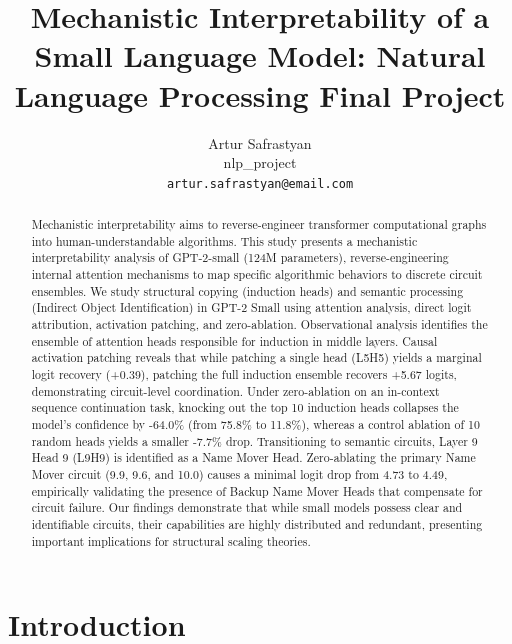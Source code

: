 \documentclass[11pt]{article}
\title{Mechanistic Interpretability of a Small Language Model: Natural Language Processing Final Project}
\author{Artur Safrastyan \\
  nlp\_project \\
  \texttt{artur.safrastyan@email.com}}
\begin{document}
\maketitle

\begin{abstract}
Mechanistic interpretability aims to reverse-engineer transformer computational graphs into human-understandable algorithms. This study presents a mechanistic interpretability analysis of GPT-2-small (124M parameters), reverse-engineering internal attention mechanisms to map specific algorithmic behaviors to discrete circuit ensembles. We study structural copying (induction heads) and semantic processing (Indirect Object Identification) in GPT-2 Small using attention analysis, direct logit attribution, activation patching, and zero-ablation. Observational analysis identifies the ensemble of attention heads responsible for induction in middle layers. Causal activation patching reveals that while patching a single head (L5H5) yields a marginal logit recovery (+0.39), patching the full induction ensemble recovers +5.67 logits, demonstrating circuit-level coordination. Under zero-ablation on an in-context sequence continuation task, knocking out the top 10 induction heads collapses the model's confidence by -64.0\% (from 75.8\% to 11.8\%), whereas a control ablation of 10 random heads yields a smaller -7.7\% drop. Transitioning to semantic circuits, Layer 9 Head 9 (L9H9) is identified as a Name Mover Head. Zero-ablating the primary Name Mover circuit (9.9, 9.6, and 10.0) causes a minimal logit drop from 4.73 to 4.49, empirically validating the presence of Backup Name Mover Heads that compensate for circuit failure. Our findings demonstrate that while small models possess clear and identifiable circuits, their capabilities are highly distributed and redundant, presenting important implications for structural scaling theories.
\end{abstract}

\section{Introduction}
\end{document}
